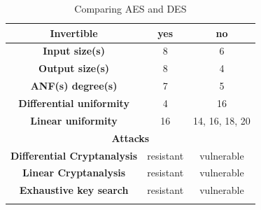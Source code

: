 \documentclass{report}
\begin{document}
\begin{longtable}[c]{|ccc|}
\multicolumn{1}{|c|}{\textbf{Invertible}}                            & \multicolumn{1}{c|}{yes}                        & no                       \\ \hline
\multicolumn{1}{|c|}{\textbf{Input size(s)}}                         & \multicolumn{1}{c|}{8}                          & 6                        \\ \hline
\multicolumn{1}{|c|}{\textbf{Output size(s)}}                        & \multicolumn{1}{c|}{8}                          & 4                        \\ \hline
\multicolumn{1}{|c|}{\textbf{ANF(s) degree(s)}}                      & \multicolumn{1}{c|}{7}                          & 5                        \\ \hline
\multicolumn{1}{|c|}{\textbf{Differential uniformity}}               & \multicolumn{1}{c|}{4}                          & 16                       \\ \hline
\multicolumn{1}{|c|}{\textbf{Linear uniformity}}                     & \multicolumn{1}{c|}{16}                         & 14, 16, 18, 20           \\ \hline
\multicolumn{3}{|c|}{\textbf{Attacks}}                                                                                                            \\ \hline
\multicolumn{1}{|c|}{\textbf{Differential Cryptanalysis}}            & \multicolumn{1}{c|}{resistant}                  & vulnerable               \\ \hline
\multicolumn{1}{|c|}{\textbf{Linear Cryptanalysis}}                  & \multicolumn{1}{c|}{resistant}                  & vulnerable               \\ \hline
\multicolumn{1}{|c|}{\textbf{Exhaustive key search}}                 & \multicolumn{1}{c|}{resistant}                  & vulnerable               \\ \hline
\caption{Comparing AES and DES}
\label{tbl:aes-vs-des}
\end{longtable}
\end{document}
